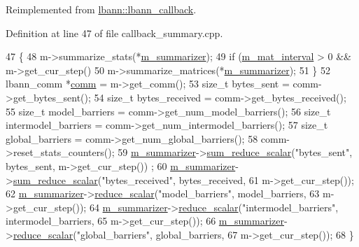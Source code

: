 Reimplemented from \hyperlink{classlbann_1_1lbann__callback_a895ca577e358601fcae5c04749f60535}{lbann\+::lbann\+\_\+callback}.



Definition at line 47 of file callback\+\_\+summary.\+cpp.


\begin{DoxyCode}
47                                                   \{
48   m->summarize\_stats(*\hyperlink{classlbann_1_1lbann__callback_a277d46138184f85f161a8263b8322c76}{m\_summarizer});
49   \textcolor{keywordflow}{if} (\hyperlink{classlbann_1_1lbann__callback__summary_ad123c5383ce6fe1212e25021579d6e3d}{m\_mat\_interval} > 0 && m->get\_cur\_step() %
50     m->summarize\_matrices(*\hyperlink{classlbann_1_1lbann__callback_a277d46138184f85f161a8263b8322c76}{m\_summarizer});
51   \}
52   lbann\_comm *\hyperlink{file__io_8cpp_ab048c6f9fcbcfaa57ce68b00263dbebe}{comm} = m->get\_comm();
53   \textcolor{keywordtype}{size\_t} bytes\_sent = comm->get\_bytes\_sent();
54   \textcolor{keywordtype}{size\_t} bytes\_received = comm->get\_bytes\_received();
55   \textcolor{keywordtype}{size\_t} model\_barriers = comm->get\_num\_model\_barriers();
56   \textcolor{keywordtype}{size\_t} intermodel\_barriers = comm->get\_num\_intermodel\_barriers();
57   \textcolor{keywordtype}{size\_t} global\_barriers = comm->get\_num\_global\_barriers();
58   comm->reset\_stats\_counters();
59   \hyperlink{classlbann_1_1lbann__callback_a277d46138184f85f161a8263b8322c76}{m\_summarizer}->\hyperlink{classlbann_1_1lbann__summary_a61dadb797450bca910d3673e03be95e0}{sum\_reduce\_scalar}(\textcolor{stringliteral}{"bytes\_sent"}, bytes\_sent, m->get\_cur\_step())
      ;
60   \hyperlink{classlbann_1_1lbann__callback_a277d46138184f85f161a8263b8322c76}{m\_summarizer}->\hyperlink{classlbann_1_1lbann__summary_a61dadb797450bca910d3673e03be95e0}{sum\_reduce\_scalar}(\textcolor{stringliteral}{"bytes\_received"}, bytes\_received,
61                                   m->get\_cur\_step());
62   \hyperlink{classlbann_1_1lbann__callback_a277d46138184f85f161a8263b8322c76}{m\_summarizer}->\hyperlink{classlbann_1_1lbann__summary_a3e0b9aae1f80403a195567fd25ea2525}{reduce\_scalar}(\textcolor{stringliteral}{"model\_barriers"}, model\_barriers,
63                               m->get\_cur\_step());
64   \hyperlink{classlbann_1_1lbann__callback_a277d46138184f85f161a8263b8322c76}{m\_summarizer}->\hyperlink{classlbann_1_1lbann__summary_a3e0b9aae1f80403a195567fd25ea2525}{reduce\_scalar}(\textcolor{stringliteral}{"intermodel\_barriers"}, intermodel\_barriers,
65                               m->get\_cur\_step());
66   \hyperlink{classlbann_1_1lbann__callback_a277d46138184f85f161a8263b8322c76}{m\_summarizer}->\hyperlink{classlbann_1_1lbann__summary_a3e0b9aae1f80403a195567fd25ea2525}{reduce\_scalar}(\textcolor{stringliteral}{"global\_barriers"}, global\_barriers,
67                               m->get\_cur\_step());
68 \}
\end{DoxyCode}
